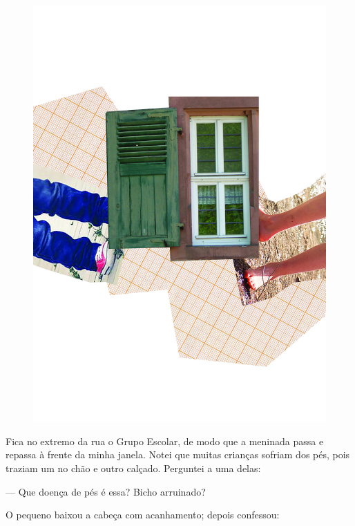 \pagebreak
\thispagestyle{empty}
\begin{figure}
\vspace*{-.5cm}
\hspace*{-2.3cm}\includegraphics[width=140mm]{../ilustracoes/04_PE.jpg}
\end{figure}
\pagebreak


\noindent{}Fica no extremo da rua o Grupo Escolar, de modo que a meninada passa e
repassa à frente da minha janela. Notei que muitas crianças sofriam dos
pés, pois traziam um no chão e outro calçado. Perguntei a uma delas:

--- Que doença de pés é essa? Bicho arruinado?

O pequeno baixou a cabeça com acanhamento; depois confessou:

